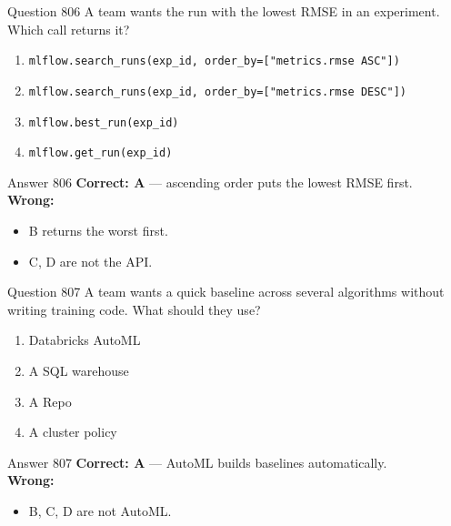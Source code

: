 \documentclass[aspectratio=169,11pt]{beamer}
\begin{document}
	\begin{frame}{Question 806}
		A team wants the run with the lowest RMSE in an experiment. Which call returns it?
		\begin{enumerate}[label=\Alph*.]
			\item \texttt{mlflow.search\_runs(exp\_id, order\_by=["metrics.rmse ASC"])}
			\item \texttt{mlflow.search\_runs(exp\_id, order\_by=["metrics.rmse DESC"])}
			\item \texttt{mlflow.best\_run(exp\_id)}
			\item \texttt{mlflow.get\_run(exp\_id)}
		\end{enumerate}
	\end{frame}
	\begin{frame}{Answer 806}
		\textbf{Correct: A} --- ascending order puts the lowest RMSE first.\\
		\vspace{0.5em}
		\textbf{Wrong:}
		\begin{itemize}
			\item B returns the worst first.
			\item C, D are not the API.
		\end{itemize}
	\end{frame}
	
	\begin{frame}{Question 807}
		A team wants a quick baseline across several algorithms without writing training code. What should they use?
		\begin{enumerate}[label=\Alph*.]
			\item Databricks AutoML
			\item A SQL warehouse
			\item A Repo
			\item A cluster policy
		\end{enumerate}
	\end{frame}
	\begin{frame}{Answer 807}
		\textbf{Correct: A} --- AutoML builds baselines automatically.\\
		\vspace{0.5em}
		\textbf{Wrong:}
		\begin{itemize}
			\item B, C, D are not AutoML.
		\end{itemize}
	\end{frame}
	
\end{document}

